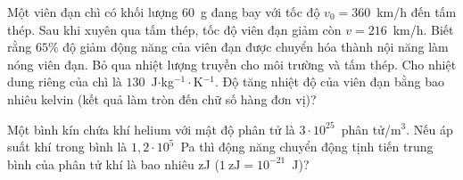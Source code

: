 	\begin{ex}%
		Một viên đạn chì có khối lượng $60$~g đang bay với tốc độ $v_0=360$~km/h đến tấm thép. Sau khi xuyên qua tấm thép, tốc độ viên đạn giảm còn $v=216$~km/h. Biết rằng $65\%$ độ giảm động năng của viên đạn được chuyển hóa thành nội năng làm nóng viên đạn. Bỏ qua nhiệt lượng truyền cho môi trường và tấm thép. Cho nhiệt dung riêng của chì là $130$~J$\cdot$kg$^{-1}\cdot$K$^{-1}$. Độ tăng nhiệt độ của viên đạn bằng bao nhiêu kelvin (kết quả làm tròn đến chữ số hàng đơn vị)?
		\par
	\end{ex}

	\begin{ex}%
		Một bình kín chứa khí helium với mật độ phân tử là $3\cdot 10^{25}$~phân tử/m$^3$. Nếu áp suất khí trong bình là $1{,}2\cdot 10^5$~Pa thì động năng chuyển động tịnh tiến trung bình của phân tử khí là bao nhiêu zJ ($1~\text{zJ}=10^{-21}$~J)?
		\par
	\end{ex}

